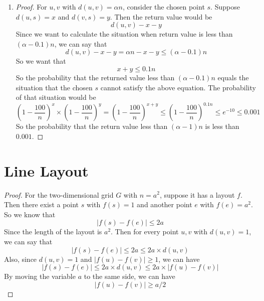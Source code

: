 \documentclass{article}
\begin{document}
\begin{enumerate}
			\item \begin{proof}
				For $u, v$ with $d(u, v) = \alpha n$, consider the chosen point $s$. Suppose $d(u, s) = x$ and $d(v, s) = y$. Then the return value would be \begin{displaymath}
					d(u, v) - x - y
				\end{displaymath}
				Since we want to calculate the situation when return value is less than $(\alpha - 0.1)n$, we can say that \begin{displaymath}
					d(u, v) - x - y = \alpha n - x - y \le (\alpha - 0.1) n
				\end{displaymath}
				So we want that  \begin{displaymath}
					x + y \le 0.1n
				\end{displaymath}
				So the probability that the returned value less than $(\alpha - 0.1) n$ equals the situation that the chosen $s$ cannot satisfy the above equation. The probability of that situation would be \begin{displaymath}
					(1 - \frac{100}{n})^x \times (1 - \frac{100}{n})^y = (1 - \frac{100}{n})^{x + y} \leq (1 - \frac{100}{n}) ^ {0.1n} \leq e^{-10} \le 0.001
				\end{displaymath}
				So the probability that the return value less than $(\alpha - 1)n$ is less than $0.001$.
			\end{proof}
		\end{enumerate}

	\section{Line Layout}
		\begin{proof}
			For the two-dimensional grid $G$ with $n = a^2$, suppose it has a layout $f$. Then there exist a point $s$ with $f(s) = 1$ and another point $e$ with $f(e) = a^2$. So we know that \begin{displaymath}
				|f(s) - f(e)| \leq 2a
			\end{displaymath}
			Since the length of the layout is $a^2$. Then for every point $u, v$ with $d(u ,v) = 1$, we can say that \begin{displaymath}
				|f(s) - f(e)| \leq 2a \leq 2a \times d(u, v)
			\end{displaymath}
			Also, since $d(u, v) = 1$ and $|f(u) - f(v)| \geq 1$, we can have \begin{displaymath}
				|f(s) - f(e)| \leq 2a \times d(u, v) \leq 2a \times |f(u) - f(v)|
			\end{displaymath}
			By moving the variable $a$ to the same side, we can have \begin{displaymath}
				|f(u) - f(v)| \geq a /  2
			\end{displaymath}
		\end{proof}
\end{document}
